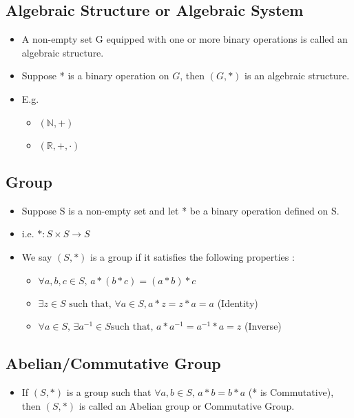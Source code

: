 \documentclass[twoside]{article}
\begin{document}
\subsection{Algebraic Structure or Algebraic System}
\begin{itemize}
	\item A non-empty set G equipped with one or more binary operations is called an algebraic structure.
	\item Suppose * is a binary operation on $G$, then $(G,*)$ is an algebraic structure.
	\item E.g.
	\begin{itemize}
		\item $(\mathbb N, +)$
		\item $(\mathbb R, +, \cdot)$
	\end{itemize}
\end{itemize}

\subsection{Group}
\begin{itemize}
	\item Suppose S is a non-empty set and let * be a binary operation defined on S.
	\item i.e. $* : S \times S \rightarrow S$ 
	\item We say $(S,*)$ is a group if it satisfies the following properties :
		\begin{itemize}
			\item $\forall a,b,c \in S \text{, }  a * (b * c) = (a * b) * c$
			\item $\exists z \in S \text{ such that, } \forall a \in S, a * z = z * a = a $ (Identity)
			\item $\forall a \in S \text{, } \exists a^{-1} \in S \text{such that, } a * a^{-1} = a^{-1} * a = z$ (Inverse)
		\end{itemize}
\end{itemize}

\subsection{Abelian/Commutative Group}
\begin{itemize}
	\item If $(S, *)$ is a group such that $\forall a, b \in S \text{, } a * b = b * a$ (* is Commutative), then $(S, *)$ is called an Abelian group or Commutative Group.
\end{itemize}
\end{document}

